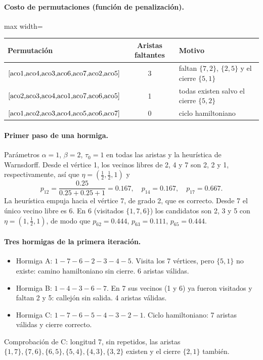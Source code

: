 \paragraph{Costo de permutaciones (función de penalización).}
\begin{center}
\begin{adjustbox}{max width=\linewidth}
\begin{tabular}{@{}lcl@{}}
\toprule
Permutación & Aristas faltantes & Motivo \\
\midrule
$\cite{aco1,aco4,aco3,aco6,aco7,aco2,aco5}$ & 3 & faltan $\{7,2\}$, $\{2,5\}$ y el cierre $\{5,1\}$ \\
$\cite{aco2,aco3,aco4,aco1,aco7,aco6,aco5}$ & 1 & todas existen salvo el cierre $\{5,2\}$ \\
$\cite{aco1,aco2,aco3,aco4,aco5,aco6,aco7}$ & 0 & ciclo hamiltoniano \\
\bottomrule
\end{tabular}
\end{adjustbox}
\end{center}

\paragraph{Primer paso de una hormiga.} Parámetros $\alpha=1$, $\beta=2$, $\tau_0=1$ en
todas las aristas y la heurística de Warnsdorff. Desde el vértice 1, los vecinos libres de
2, 4 y 7 son 2, 2 y 1, respectivamente, así que $\eta=(\tfrac12,\tfrac12,1)$ y
\[
  p_{12}=\frac{0.25}{0.25+0.25+1}=0.167,\quad p_{14}=0.167,\quad p_{17}=0.667.
\]
La heurística empuja hacia el vértice 7, de grado 2, que es correcto. Desde 7 el único
vecino libre es 6. En 6 (visitados $\{1,7,6\}$) los candidatos son 2, 3 y 5 con
$\eta=(1,\tfrac12,1)$, de modo que $p_{62}=0.444$, $p_{63}=0.111$, $p_{65}=0.444$.

\paragraph{Tres hormigas de la primera iteración.}
\begin{itemize}[nosep]
  \item Hormiga A: $1\!-\!7\!-\!6\!-\!2\!-\!3\!-\!4\!-\!5$. Visita los 7 vértices,
        pero $\{5,1\}$ no existe: camino hamiltoniano sin cierre. 6 aristas válidas.
  \item Hormiga B: $1\!-\!4\!-\!3\!-\!6\!-\!7$. En 7 sus vecinos (1 y 6) ya fueron
        visitados y faltan 2 y 5: callejón sin salida. 4 aristas válidas.
  \item Hormiga C: $1\!-\!7\!-\!6\!-\!5\!-\!4\!-\!3\!-\!2\!-\!1$. Ciclo
        hamiltoniano: 7 aristas válidas y cierre correcto.
\end{itemize}
Comprobación de C: longitud 7, sin repetidos, las aristas
$\{1,7\},\{7,6\},\{6,5\},\{5,4\},\{4,3\},\{3,2\}$ existen y el cierre $\{2,1\}$ también.

